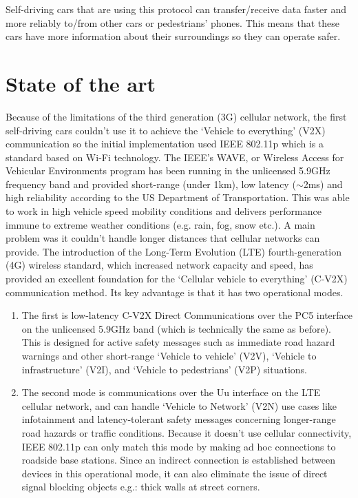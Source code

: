 \documentclass[conference]{IEEEtran}
\begin{document}
Self-driving cars that are using this protocol can transfer/receive data faster and more reliably to/from other cars or pedestrians' phones. This means that these cars have more information about their surroundings so they can operate safer.

\section{State of the art}
Because of the limitations of the third generation (3G) cellular network, the first self-driving cars couldn’t use it to achieve the ‘Vehicle to everything’ (V2X) communication so the initial implementation used IEEE 802.11p  which is a standard based on Wi-Fi technology. The IEEE's WAVE, or Wireless Access for Vehicular Environments program has been running in the unlicensed 5.9GHz frequency band and provided short-range (under 1km), low latency ($ \sim $2ms) and high reliability according to the US Department of Transportation. This was able to work in high vehicle speed mobility conditions and delivers performance immune to extreme weather conditions (e.g. rain, fog, snow etc.). A main problem was it couldn’t handle longer distances that cellular networks can provide. The introduction of the Long-Term Evolution (LTE) fourth-generation (4G) wireless standard, which increased network capacity and speed, has provided an excellent foundation for the ‘Cellular vehicle to everything’ (C-V2X) communication method. Its key advantage is that it has two operational modes.

\begin{enumerate}
    \item The first is low-latency C-V2X Direct Communications over the PC5 interface on the unlicensed 5.9GHz band (which is technically the same as before). This is designed for active safety messages such as immediate road hazard warnings and other short-range ‘Vehicle to vehicle’ (V2V), ‘Vehicle to infrastructure’ (V2I), and ‘Vehicle to pedestrians’ (V2P) situations. \medskip
    \item The second mode is communications over the Uu interface on the LTE cellular network, and can handle ‘Vehicle to Network’ (V2N) use cases like infotainment and latency-tolerant safety messages concerning longer-range road hazards or traffic conditions. Because it doesn't use cellular connectivity, IEEE 802.11p can only match this mode by making ad hoc connections to roadside base stations. Since an indirect connection is established between devices in this operational mode, it can also eliminate the issue of direct signal blocking objects e.g.: thick walls at street corners. \cite{b2} \smallskip
\end{enumerate}
\end{document}
